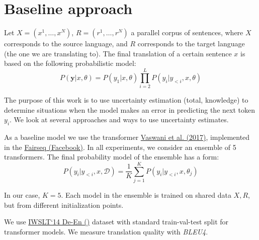 \documentclass[a4paper,14pt]{extarticle}
\newcommand{\bibref}[3]{\hyperlink{#1}{#2 (#3)}}
\begin{document}
\section{Baseline approach}
	Let $X = (x^1, \dots, x^N)$, $R = (r^1, \dots, r^N)$ a parallel corpus of sentences, where $X$ corresponds to the source language, and $R$ corresponds to the target language (the one we are translating to). The final translation of a certain sentence $x$ is based on the following probabilistic model:
	\begin{equation*}
		P(\textbf{y} | x, \theta) = P(y_1 | x, \theta) \prod_{i=2}^{L} P(y_i | y_{<i}, x, \theta)
	\end{equation*}
	
	The purpose of this work is to use uncertainty estimation (total, knowledge) to determine situations when the model makes an error in predicting the next token $y_i$. We look at several approaches and ways to use uncertainty estimates.

	As a baseline model we use the transformer \bibref{transformer}{Vaswani et al.} {2017}, implemented in the \bibref{fairseq}{Fairseq}{Facebook}. In all experiments, we consider an ensemble of 5 transformers. The final probability model of the ensemble has a form:
	\begin{equation*}
		P(y_i | y_{<i}, x, \mathcal{D}) = \frac1{K} \sum_{j=1}^{K}P(y_i | y_{<i}, x, \theta_j)
	\end{equation*}
	
	In our case, $K=5$. Each model in the ensemble is trained on shared data $X, R$, but from different initialization points.

	We use \bibref{iwslt}{IWSLT`14 De-En}{} dataset with standard train-val-test split for transformer models. We measure translation quality with \textit{BLEU4}.
	
	\begin{figure}[t]
	\end{figure}
	
\end{document}
